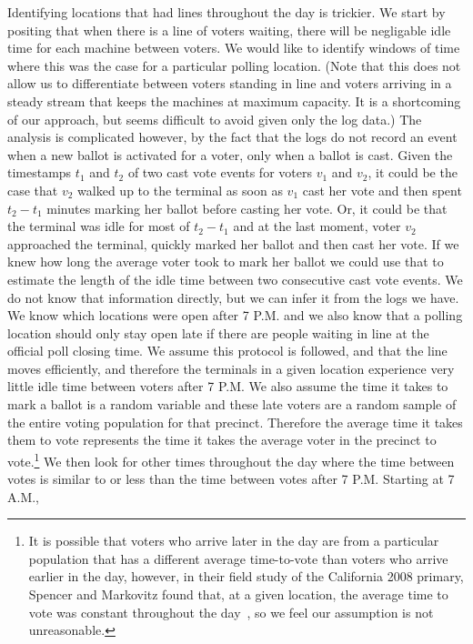 \documentclass[letterpaper,twocolumn,10pt]{article}
\begin{document}
Identifying locations that had lines throughout the day is trickier. We start by
positing that when there is a line of voters waiting, there will be negligable
idle time for each machine between voters. We would like to identify windows of
time where this was the case for a particular polling location. (Note that this
does not allow us to differentiate between voters standing in line and voters
arriving in a steady stream that keeps the machines at maximum capacity. It is a
shortcoming of our approach, but seems difficult to avoid given only the log
data.) The analysis is complicated however, by the fact that the logs do not
record an event when a new ballot is activated for a voter, only when a ballot
is cast. Given the timestamps $t_1$ and $t_2$ of two cast vote events for voters
$v_1$ and $v_2$, it could be the case that $v_2$ walked up to the terminal
as soon as $v_1$ cast her vote and then spent $t_2-t_1$ minutes marking her
ballot before casting her vote. Or, it could be that the terminal was idle for
most of $t_2-t_1$ and at the last moment, voter $v_2$ approached the terminal,
quickly marked her ballot and then cast her vote. If we knew how long the
average voter took to mark her ballot we could use that to estimate the length
of the idle time between two consecutive cast vote events. We do not know that
information directly, but we can infer it from the logs we have. We know which
locations were open after 7 P.M. and we also know that a polling location should
only stay open late if there are people waiting in line at the official poll
closing time. We assume this protocol is followed, and that
the line moves efficiently, and therefore the terminals in a given location
experience very little idle time between voters after 7 P.M. We also assume
the time it takes to mark a ballot is a random variable and these late voters
are a random sample of the entire voting population for that precinct. Therefore
the average time it takes them to vote represents the time it takes the average
voter in the precinct to vote.\footnote{It is possible that voters who arrive later in
the day are from a particular population that has a different average
time-to-vote than voters who arrive earlier in the day, however, in their field
study of the California 2008 primary, Spencer and Markovitz found that, at a
given location, the
average time to vote was constant throughout the day~\cite{Spencer2010}, so we
feel our assumption is not unreasonable.} We 
then look for other times throughout the day where the time between votes is
similar to or less than the time between votes after 7 P.M. Starting at 7 A.M.,
\end{document}
